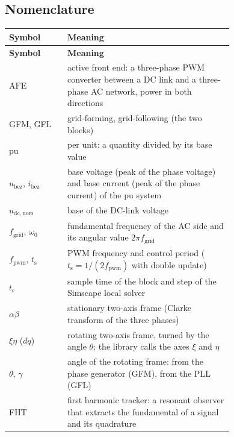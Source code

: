 \documentclass[11pt,a4paper]{scrartcl}
\newcommand{\ped}[1]{_{\mathrm{#1}}}
\begin{document}


\tableofcontents
\listoffigures
\listoftables
\newpage

\begin{onehalfspace}

\section*{Nomenclature}
\label{sec:nomenclature}

\begin{longtable}{@{} l p{0.74\linewidth} @{}}
	\toprule
	\textbf{Symbol} & \textbf{Meaning} \\
	\midrule
	\endfirsthead
	\toprule
	\textbf{Symbol} & \textbf{Meaning} \\
	\midrule
	\endhead
	\bottomrule
	\endfoot
	\bottomrule
	\endlastfoot
	AFE & active front end: a three-phase PWM converter between a DC link and a three-phase AC network, power in both directions \\
	GFM, GFL & grid-forming, grid-following (the two blocks) \\
	pu & per unit: a quantity divided by its base value \\
	$u\ped{bez}$, $i\ped{bez}$ & base voltage (peak of the phase voltage) and base current (peak of the phase current) of the pu system \\
	$u\ped{dc,nom}$ & base of the DC-link voltage \\
	$f\ped{grid}$, $\omega\ped{0}$ & fundamental frequency of the AC side and its angular value $2\pi f\ped{grid}$ \\
	$f\ped{pwm}$, $t\ped{s}$ & PWM frequency and control period ($t\ped{s} = 1/(2 f\ped{pwm})$ with double update) \\
	$t\ped{c}$ & sample time of the block and step of the Simscape local solver \\
	$\alpha\beta$ & stationary two-axis frame (Clarke transform of the three phases) \\
	$\xi\eta$ ($dq$) & rotating two-axis frame, turned by the angle $\theta$; the library calls the axes $\xi$ and $\eta$ \\
	$\theta$, $\gamma$ & angle of the rotating frame: from the phase generator (GFM), from the PLL (GFL) \\
	FHT & first harmonic tracker: a resonant observer that extracts the fundamental of a signal and its quadrature \\

\end{longtable}
\end{onehalfspace}
\end{document}
